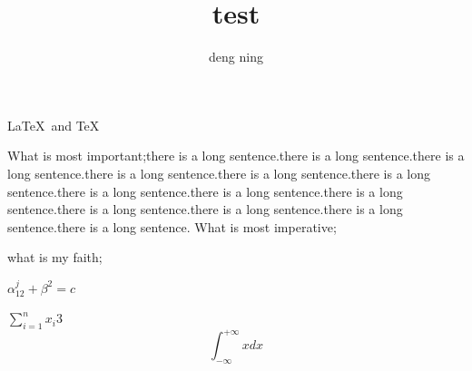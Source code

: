 \documentclass{ctexart}
\author{deng ning}
\title{test}
\begin{document}
\maketitle
\LaTeX  \ and \TeX

What is most important;there is a long sentence.there is a long sentence.there is a long sentence.there is a long sentence.there is a long sentence.there is a long sentence.there is a long sentence.there is a long sentence.there is a long sentence.there is a long sentence.there is a long sentence.there is a long sentence.there is a long sentence.
What is most imperative;

what is my faith;

$\alpha_{12}^j+\beta^2=c$

$\sum_{i=1}^n {x_i}$3
\[   \int_{-\infty}^{+\infty}x dx  \]
\end{document}
